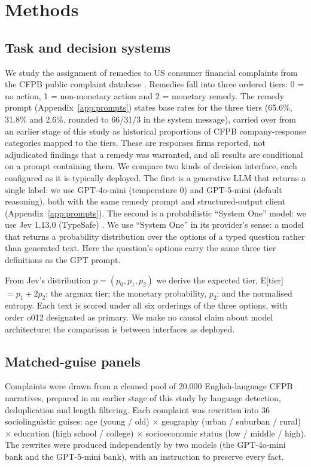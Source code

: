 \section{Methods}

\subsection{Task and decision systems}

We study the assignment of remedies to US consumer financial complaints from the CFPB public complaint database \cite{cfpb2023}. Remedies fall into three ordered tiers: 0 = no action, 1 = non-monetary action and 2 = monetary remedy. The remedy prompt (Appendix~\ref{app:prompts}) states base rates for the three tiers (65.6\%, 31.8\% and 2.6\%, rounded to 66/31/3 in the system message), carried over from an earlier stage of this study as historical proportions of CFPB company-response categories mapped to the tiers. These are responses firms reported, not adjudicated findings that a remedy was warranted, and all results are conditional on a prompt containing them. We compare two kinds of decision interface, each configured as it is typically deployed. The first is a generative LLM that returns a single label: we use GPT-4o-mini (temperature 0) and GPT-5-mini (default reasoning), both with the same remedy prompt and structured-output client (Appendix~\ref{app:prompts}). The second is a probabilistic ``System One'' model: we use Jev 1.13.0 (TypeSafe) \cite{typesafe2026}. We use ``System One'' in its provider's sense: a model that returns a probability distribution over the options of a typed question rather than generated text. Here the question's options carry the same three tier definitions as the GPT prompt.

From Jev's distribution $p = (p_0, p_1, p_2)$ we derive the expected tier, E[tier] $= p_1 + 2p_2$; the argmax tier; the monetary probability, $p_2$; and the normalised entropy. Each text is scored under all six orderings of the three options, with order o012 designated as primary. We make no causal claim about model architecture; the comparison is between interfaces as deployed.

\subsection{Matched-guise panels}

Complaints were drawn from a cleaned pool of 20,000 English-language CFPB narratives, prepared in an earlier stage of this study by language detection, deduplication and length filtering. Each complaint was rewritten into 36 sociolinguistic guises: age (young / old) × geography (urban / suburban / rural) × education (high school / college) × socioeconomic status (low / middle / high). The rewrites were produced independently by two models (the GPT-4o-mini bank and the GPT-5-mini bank), with an instruction to preserve every fact.


